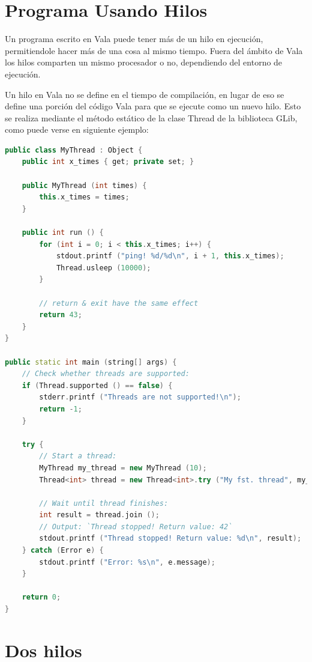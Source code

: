 \documentclass[12pt,twoside]{book}
\begin{document}
\section{Programa Usando Hilos}

Un programa escrito en Vala puede tener más de un hilo en ejecución, permitiendole hacer más de una cosa al mismo tiempo. Fuera del ámbito de Vala los hilos comparten un mismo procesador o no, dependiendo del entorno de ejecución.

Un hilo en Vala no se define en el tiempo de compilación, en lugar de eso se define una porción del código Vala para que se ejecute como un nuevo hilo. Esto se realiza mediante el método estático de la clase Thread de la biblioteca GLib, como puede verse en siguiente ejemplo:


\begin{lstlisting}[language=C++]
public class MyThread : Object {
	public int x_times { get; private set; }

	public MyThread (int times) {
		this.x_times = times;
	}

	public int run () {
		for (int i = 0; i < this.x_times; i++) {
			stdout.printf ("ping! %d/%d\n", i + 1, this.x_times);
			Thread.usleep (10000);
		}

		// return & exit have the same effect
		return 43;
	}
}

public static int main (string[] args) {
	// Check whether threads are supported:
	if (Thread.supported () == false) {
		stderr.printf ("Threads are not supported!\n");
		return -1;
	}

	try {
		// Start a thread:
		MyThread my_thread = new MyThread (10);
		Thread<int> thread = new Thread<int>.try ("My fst. thread", my_thread.run);

		// Wait until thread finishes:
		int result = thread.join ();
		// Output: `Thread stopped! Return value: 42`
		stdout.printf ("Thread stopped! Return value: %d\n", result);
	} catch (Error e) {
		stdout.printf ("Error: %s\n", e.message);
	}

	return 0;
}

\end{lstlisting}

\section{Dos hilos}
\end{document}
